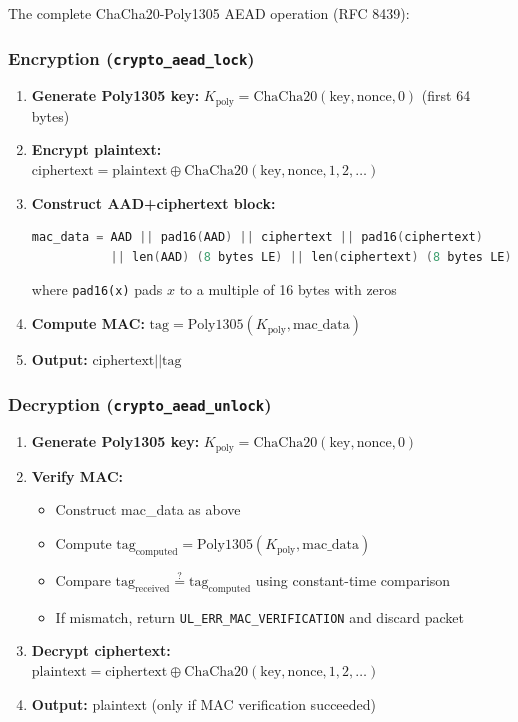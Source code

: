 \documentclass[11pt,a4paper]{article}
\begin{document}
The complete ChaCha20-Poly1305 AEAD operation (RFC 8439):

\subsubsection{Encryption (\texttt{crypto\_aead\_lock})}

\begin{enumerate}[noitemsep]
    \item \textbf{Generate Poly1305 key:} $K_{\text{poly}} = \text{ChaCha20}(\text{key}, \text{nonce}, 0)$ (first 64 bytes)
    \item \textbf{Encrypt plaintext:} $\text{ciphertext} = \text{plaintext} \oplus \text{ChaCha20}(\text{key}, \text{nonce}, 1, 2, \ldots)$
    \item \textbf{Construct AAD+ciphertext block:}
    \begin{lstlisting}[language=C,basicstyle=\ttfamily\footnotesize]
mac_data = AAD || pad16(AAD) || ciphertext || pad16(ciphertext)
           || len(AAD) (8 bytes LE) || len(ciphertext) (8 bytes LE)
    \end{lstlisting}
    where \texttt{pad16(x)} pads $x$ to a multiple of 16 bytes with zeros
    \item \textbf{Compute MAC:} $\text{tag} = \text{Poly1305}(K_{\text{poly}}, \text{mac\_data})$
    \item \textbf{Output:} $\text{ciphertext} || \text{tag}$
\end{enumerate}

\subsubsection{Decryption (\texttt{crypto\_aead\_unlock})}

\begin{enumerate}[noitemsep]
    \item \textbf{Generate Poly1305 key:} $K_{\text{poly}} = \text{ChaCha20}(\text{key}, \text{nonce}, 0)$
    \item \textbf{Verify MAC:}
    \begin{itemize}
        \item Construct mac\_data as above
        \item Compute $\text{tag}_{\text{computed}} = \text{Poly1305}(K_{\text{poly}}, \text{mac\_data})$
        \item Compare $\text{tag}_{\text{received}} \stackrel{?}{=} \text{tag}_{\text{computed}}$ using constant-time comparison
        \item If mismatch, return \texttt{UL\_ERR\_MAC\_VERIFICATION} and discard packet
    \end{itemize}
    \item \textbf{Decrypt ciphertext:} $\text{plaintext} = \text{ciphertext} \oplus \text{ChaCha20}(\text{key}, \text{nonce}, 1, 2, \ldots)$
    \item \textbf{Output:} plaintext (only if MAC verification succeeded)
\end{enumerate}
\end{document}
